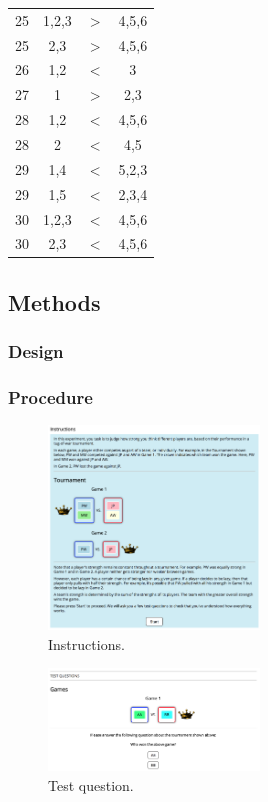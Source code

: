 \documentclass[11pt]{article}
\begin{document}
{\begin{longtable}{cccc}
  \midrule
  25 & 1,2,3 & $>$ & 4,5,6 \\ 
  25 & 2,3 & $>$ & 4,5,6 \\ 
  \midrule
  26 & 1,2 & $<$ & 3 \\ 
  \midrule
  27 & 1 & $>$ & 2,3 \\ 
  \midrule
  28 & 1,2 & $<$ & 4,5,6 \\ 
  28 & 2 & $<$ & 4,5 \\ 
  \midrule
  29 & 1,4 & $<$ & 5,2,3 \\ 
  29 & 1,5 & $<$ & 2,3,4 \\ 
  \midrule
  30 & 1,2,3 & $<$ & 4,5,6 \\ 
  30 & 2,3 & $<$ & 4,5,6 \\ 
 \bottomrule
\end{longtable}
}

\subsection{Methods}
\label{sub:methods}

\subsubsection{Design}
\label{ssub:design}

\subsubsection{Procedure}
\label{ssub:procedure}

\begin{figure}[H]
	\centering
	\includegraphics[width=0.5\textwidth]{exp1_screenshot1}
	\caption{Instructions.}
	\label{fig:exp1_screenshot1}
\end{figure}

\begin{figure}[H]
	\centering
	\includegraphics[width=0.5\textwidth]{exp1_screenshot2}
	\caption{Test question.}
	\label{fig:exp1_screenshot2}
\end{figure}
\end{document}
